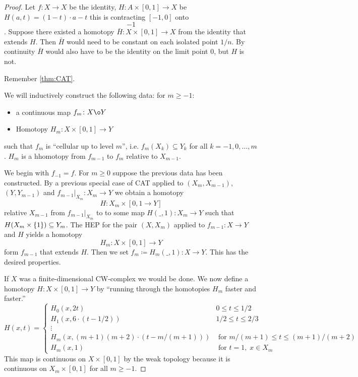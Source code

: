 \documentclass{TemplateLecture}
\begin{document}
\begin{proof}
    Let \(f\colon X \to X\) be the identity, \(H\colon A \times [0,1] \to X \) be \(H(a,t) = (1-t) \cdot a - t\) this is contracting \([-1,0]\) onto \[-1\]. Suppose there existed a homotopy \(\bar H \colon X \times [0,1] \to X\) from the identity that extends \(H\). Then \(\bar H\) would need to be constant on each isolated point \(1/n\). By continuity \(\bar H\) would also have to be the identity on the limit point \(0\), but \(H\) is not.

    Remember \ref{thm:CAT}.

    We will inductively construct the following data: for \(m \geq -1\):
    \begin{itemize}
        \item a continuous map \(f_m \colon X \o Y\)
        \item Homotopy \(H_m \colon X \times [0, 1] \to Y\)
    \end{itemize}
    such that \(f_m\) is \enquote{cellular up to level \(m\)}, i.e. \(f_m(X_k) \subseteq Y_k\) for all \(k = -1, 0, \dots, m\).
    \(H_m\) is a hhomotopy from \(f_{m-1}\) to \(f_m\) relative to \(X_{m-1}\).

    We begin with \(f_{-1} = f\). For \(m \geq 0\) suppose the previous data has been constructed. By a previous special case of CAT applied to \((X_m, X_{m-1})\), \((Y, Y_{m-1})\) and \(f_{m-1}\rvert_{X_m} \colon X_m \to Y\) we obtain a homotopy
    \[H\colon X_m \times [0,1 \to Y]\]
    relative \(X_{m-1}\) from \(f_{m-1} \rvert_{X_m}\) to to some map \(H(\_, 1)\colon X_m \to Y\) such that \(H(X_m \times \{1\}) \subseteq Y_m\). The HEP for the pair \((X, X_m)\) applied to \(f_{m-1} \colon X \to Y\) and \(H\) yields a homotopy
    \[H_m \colon X \times [0,1] \to Y\]
    form \(f_{m-1}\) that extends \(H\). Then we set \(f_m \coloneq H_m(\_,1)\colon X \to Y\). This has the desired properties.

    If \(X\) was a finite-dimensional CW-complex we would be done.
    We now define a homotopy \(H\colon X \times [0,1] \to Y\) by \enquote{running through the homotopies \(H_m\) faster and faster.}
    \[H(x,t) = \begin{cases}
        H_0(x, 2t) & 0 \leq t \leq 1/2 \\
        H_1(x, 6 \cdot (t - 1/2)) & 1/2 \leq t \leq 2/3 \\
        \vdots & \\
        H_m(x, (m+1)(m+2) \cdot (t - m/(m+1))) & \text{ for } m/(m+1) \leq t \leq (m+1)/(m+2) \\
        H_m(x,1) & \text{ for } t = 1, \;x \in X_m
    \end{cases}\]
    This map is continuous on \(X \times [0,1]\) by the weak topology because it is continuous on \(X_m \times [0,1]\) for all \(m \geq -1\).
\end{proof}
\end{document}
